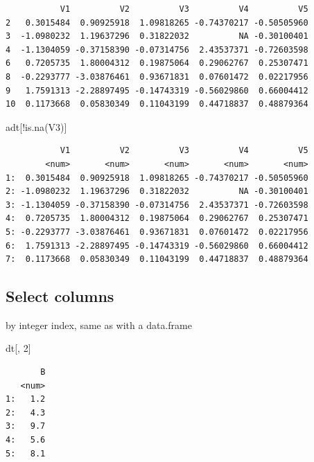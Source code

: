 \documentclass[
]{book}
\newenvironment{Shaded}{\begin{snugshade}}{\end{snugshade}}
\newcommand{\DecValTok}[1]{\textcolor[rgb]{0.00,0.00,0.81}{#1}}
\newcommand{\FunctionTok}[1]{\textcolor[rgb]{0.00,0.00,0.00}{#1}}
\newcommand{\NormalTok}[1]{#1}
\newcommand{\SpecialCharTok}[1]{\textcolor[rgb]{0.00,0.00,0.00}{#1}}
\begin{document}
\begin{verbatim}
           V1          V2          V3          V4          V5
2   0.3015484  0.90925918  1.09818265 -0.74370217 -0.50505960
3  -1.0980232  1.19637296  0.31822032          NA -0.30100401
4  -1.1304059 -0.37158390 -0.07314756  2.43537371 -0.72603598
6   0.7205735  1.80004312  0.19875064  0.29062767  0.25307471
8  -0.2293777 -3.03876461  0.93671831  0.07601472  0.02217956
9   1.7591313 -2.28897495 -0.14743319 -0.56029860  0.66004412
10  0.1173668  0.05830349  0.11043199  0.44718837  0.48879364
\end{verbatim}

\begin{Shaded}
\begin{Highlighting}[]
\NormalTok{adt[}\SpecialCharTok{!}\FunctionTok{is.na}\NormalTok{(V3)]}
\end{Highlighting}
\end{Shaded}

\begin{verbatim}
           V1          V2          V3          V4          V5
        <num>       <num>       <num>       <num>       <num>
1:  0.3015484  0.90925918  1.09818265 -0.74370217 -0.50505960
2: -1.0980232  1.19637296  0.31822032          NA -0.30100401
3: -1.1304059 -0.37158390 -0.07314756  2.43537371 -0.72603598
4:  0.7205735  1.80004312  0.19875064  0.29062767  0.25307471
5: -0.2293777 -3.03876461  0.93671831  0.07601472  0.02217956
6:  1.7591313 -2.28897495 -0.14743319 -0.56029860  0.66004412
7:  0.1173668  0.05830349  0.11043199  0.44718837  0.48879364
\end{verbatim}

\hypertarget{select-columns}{%
\subsection{Select columns}\label{select-columns}}

by integer index, same as with a data.frame

\begin{Shaded}
\begin{Highlighting}[]
\NormalTok{dt[, }\DecValTok{2}\NormalTok{]}
\end{Highlighting}
\end{Shaded}

\begin{verbatim}
       B
   <num>
1:   1.2
2:   4.3
3:   9.7
4:   5.6
5:   8.1
\end{verbatim}
\end{document}
